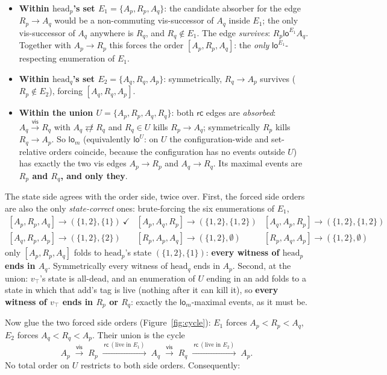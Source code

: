\documentclass[11pt]{article}
\newcommand{\vis}{\xrightarrow{\mathsf{vis}}}
\newcommand{\rcrel}{\mathsf{rc}}
\newcommand{\ncomm}{\not\rightleftarrows}
\newcommand{\loE}[1]{\mathsf{lo}^{#1}}
\newcommand{\lom}{\mathsf{lo}_m}
\newcommand{\Ap}{A_p}
\newcommand{\Aq}{A_q}
\newcommand{\Rp}{R_p}
\newcommand{\Rq}{R_q}
\begin{document}
\begin{itemize}[leftmargin=2em]
\item \textbf{Within $\mathrm{head}_p$'s set
  $E_1 = \{\Ap, \Rp, \Aq\}$}: the candidate absorber for the edge
  $\Rp \to \Aq$ would be a non-commuting vis-successor of $\Aq$ inside
  $E_1$; the only vis-successor of $\Aq$ anywhere is $\Rq$, and
  $\Rq \notin E_1$. The edge \emph{survives}:
  $\Rp \mathrel{\loE{E_1}} \Aq$. Together with $\Ap \to \Rp$ this
  forces the order $[\Ap, \Rp, \Aq]$: the \emph{only}
  $\loE{E_1}$-respecting enumeration of $E_1$.
\item \textbf{Within $\mathrm{head}_q$'s set
  $E_2 = \{\Aq, \Rq, \Ap\}$}: symmetrically, $\Rq \to \Ap$ survives
  ($\Rp \notin E_2$), forcing $[\Aq, \Rq, \Ap]$.
\item \textbf{Within the union $U = \{\Ap, \Rp, \Aq, \Rq\}$}: both
  $\rcrel$ edges are \emph{absorbed}: $\Aq \vis \Rq$ with
  $\Aq \ncomm \Rq$ and $\Rq \in U$ kills $\Rp \to \Aq$; symmetrically
  $\Rp$ kills $\Rq \to \Ap$. So $\lom$ (equivalently $\loE{U}$: on $U$
  the configuration-wide and set-relative orders coincide, because the
  configuration has no events outside $U$) has exactly the two vis
  edges $\Ap \to \Rp$ and $\Aq \to \Rq$. Its maximal events are
  \textbf{$\Rp$ and $\Rq$, and only they}.
\end{itemize}

The state side agrees with the order side, twice over. First, the
forced side orders are also the only \emph{state-correct} ones:
brute-forcing the six enumerations of $E_1$,
\[
\begin{array}{llllll}
[\Ap,\Rp,\Aq] \to (\{1,2\},\{1\})\ \checkmark &
[\Ap,\Aq,\Rp] \to (\{1,2\},\{1,2\}) &
[\Aq,\Ap,\Rp] \to (\{1,2\},\{1,2\}) \\{}
[\Aq,\Rp,\Ap] \to (\{1,2\},\{2\}) &
[\Rp,\Ap,\Aq] \to (\{1,2\},\emptyset) &
[\Rp,\Aq,\Ap] \to (\{1,2\},\emptyset)
\end{array}
\]
only $[\Ap, \Rp, \Aq]$ folds to $\mathrm{head}_p$'s state
$(\{1,2\},\{1\})$: \textbf{every witness of $\mathrm{head}_p$ ends in
$\Aq$}. Symmetrically every witness of $\mathrm{head}_q$ ends in
$\Ap$. Second, at the union: $v_\top$'s state is all-dead, and an
enumeration of $U$ ending in an add folds to a state in which that
add's tag is live (nothing after it can kill it), so \textbf{every
witness of $v_\top$ ends in $\Rp$ or $\Rq$}: exactly the
$\lom$-maximal events, as it must be.

Now glue the two forced side orders (Figure~\ref{fig:cycle}): $E_1$
forces $\Ap < \Rp < \Aq$, $E_2$ forces $\Aq < \Rq < \Ap$. Their union
is the cycle
\[
  \Ap \;\vis\; \Rp \;\xrightarrow{\ \rcrel\ (\text{live in } E_1)\ }\;
  \Aq \;\vis\; \Rq \;\xrightarrow{\ \rcrel\ (\text{live in } E_2)\ }\;
  \Ap .
\]
No total order on $U$ restricts to both side orders. Consequently:
\end{document}
